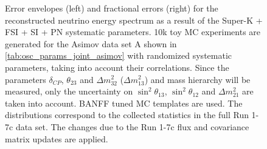 \begin{figure}[htb]
\caption {
Error envelopes (left) and fractional errors (right) for the reconstructed neutrino energy spectrum
as a result of the Super-K + FSI + SI + PN systematic parameters.
10k toy MC experiments are generated for the Asimov data set A shown in \cref{tab:osc_params_joint_asimov}
with randomized systematic parameters, taking into account their correlations.
Since the parameters $\delta_{CP}$, $\theta_{23}$ and $\Delta m^2_{32}$ ($\Delta m^2_{13}$) and mass hierarchy
will be measured,
only the uncertainty on 
$\sin^2 \theta_{13}$,
$\sin^2 \theta_{12}$
and 
$\Delta m^2_{21}$ 
are taken into account.
BANFF tuned MC templates are used. 
The distributions correspond to the collected statistics in the full Run 1-7c data set.
The changes due to the Run 1-7c flux and covariance matrix updates are applied.
}
\label{fig:SKDet_FSI_envelope_Asimov_A_run17c}
\end{figure}





